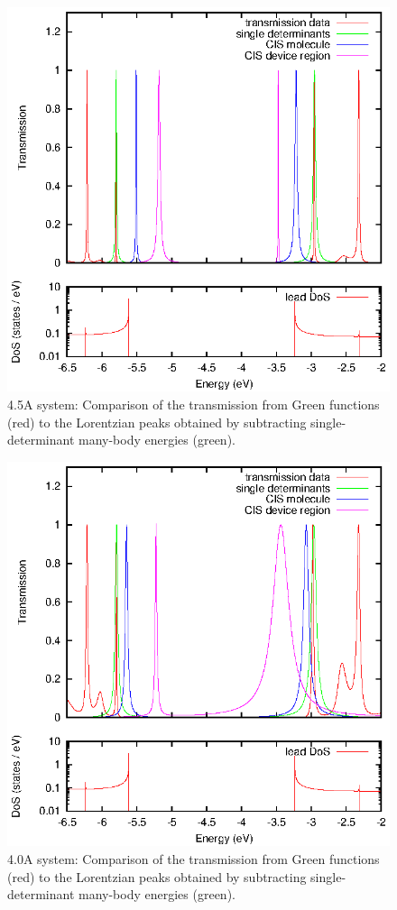 \begin{figure}[h]
	\begin{center}
		\includegraphics[width=0.9\linewidth]{figures/nobrsingles45A.eps}
	\end{center}
	\caption{4.5A system: Comparison of the transmission from Green
                 functions (red) to the Lorentzian peaks obtained by
                 subtracting single-determinant many-body energies (green).}
	\label{fig:nobranch45A}
\end{figure}

\begin{figure}[h]
	\begin{center}
		\includegraphics[width=0.9\linewidth]{figures/nobrsingles40A.eps}
	\end{center}
	\caption{4.0A system: Comparison of the transmission from Green
                 functions (red) to the Lorentzian peaks obtained by
                 subtracting single-determinant many-body energies (green).}
	\label{fig:nobranch40A}
\end{figure}

